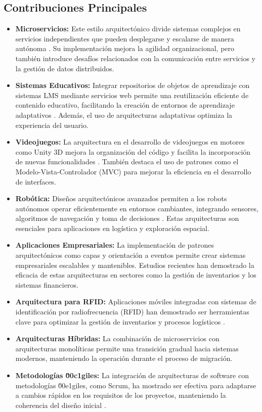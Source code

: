 \documentclass[conference]{IEEEtran}
\begin{document}
\subsection{Contribuciones Principales}
\begin{itemize}
    \item \textbf{Microservicios:} Este estilo arquitect\'onico divide sistemas complejos en servicios independientes que pueden desplegarse y escalarse de manera aut\'onoma \cite{richardson2019microservices}. Su implementaci\'on mejora la agilidad organizacional, pero tambi\'en introduce desaf\'ios relacionados con la comunicaci\'on entre servicios y la gesti\'on de datos distribuidos.
    \item \textbf{Sistemas Educativos:} Integrar repositorios de objetos de aprendizaje con sistemas LMS mediante servicios web permite una reutilizaci\'on eficiente de contenido educativo, facilitando la creaci\'on de entornos de aprendizaje adaptativos \cite{anced2010elearning}. Adem\'as, el uso de arquitecturas adaptativas optimiza la experiencia del usuario.
    \item \textbf{Videojuegos:} La arquitectura en el desarrollo de videojuegos en motores como Unity 3D mejora la organizaci\'on del c\'odigo y facilita la incorporaci\'on de nuevas funcionalidades \cite{stack2005videogame}. Tambi\'en destaca el uso de patrones como el Modelo-Vista-Controlador (MVC) para mejorar la eficiencia en el desarrollo de interfaces.
    \item \textbf{Rob\'otica:} Dise\~nos arquitect\'onicos avanzados permiten a los robots aut\'onomos operar eficientemente en entornos cambiantes, integrando sensores, algoritmos de navegaci\'on y toma de decisiones \cite{shaw1996software}. Estas arquitecturas son esenciales para aplicaciones en log\'istica y exploraci\'on espacial.
    \item \textbf{Aplicaciones Empresariales:} La implementaci\'on de patrones arquitect\'onicos como capas y orientaci\'on a eventos permite crear sistemas empresariales escalables y mantenibles. Estudios recientes han demostrado la eficacia de estas arquitecturas en sectores como la gesti\'on de inventarios y los sistemas financieros.
    \item \textbf{Arquitectura para RFID:} Aplicaciones m\'oviles integradas con sistemas de identificaci\'on por radiofrecuencia (RFID) han demostrado ser herramientas clave para optimizar la gesti\'on de inventarios y procesos log\'isticos \cite{pavon2009mvc}.
    \item \textbf{Arquitecturas H\'ibridas:} La combinaci\'on de microservicios con arquitecturas monol\'iticas permite una transici\'on gradual hacia sistemas modernos, manteniendo la operaci\'on durante el proceso de migraci\'on.
    \item \textbf{Metodolog\'ias \u00c1giles:} La integraci\'on de arquitecturas de software con metodolog\'ias \u00e1giles, como Scrum, ha mostrado ser efectiva para adaptarse a cambios r\'apidos en los requisitos de los proyectos, manteniendo la coherencia del dise\~no inicial \cite{schwaber2017scrum}.
\end{itemize}
\end{document}
